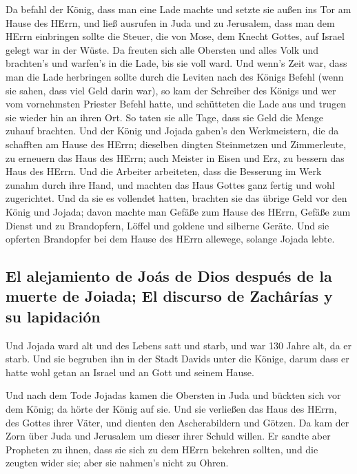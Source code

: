  Da befahl der König, dass man eine Lade machte und setzte
sie außen ins Tor am Hause des HErrn,  und ließ ausrufen
in Juda und zu Jerusalem, dass man dem HErrn einbringen sollte die
Steuer, die von Mose, dem Knecht Gottes, auf Israel gelegt war in der
Wüste.  Da freuten sich alle Obersten und alles Volk und
brachten's und warfen's in die Lade, bis sie voll ward. 
Und wenn's Zeit war, dass man die Lade herbringen sollte durch die
Leviten nach des Königs Befehl (wenn sie sahen, dass viel Geld darin
war), so kam der Schreiber des Königs und wer vom vornehmsten Priester
Befehl hatte, und schütteten die Lade aus und trugen sie wieder hin an
ihren Ort. So taten sie alle Tage, dass sie Geld die Menge zuhauf
brachten.  Und der König und Jojada gaben's den
Werkmeistern, die da schafften am Hause des HErrn; dieselben dingten
Steinmetzen und Zimmerleute, zu erneuern das Haus des HErrn; auch
Meister in Eisen und Erz, zu bessern das Haus des HErrn. 
Und die Arbeiter arbeiteten, dass die Besserung im Werk zunahm durch
ihre Hand, und machten das Haus Gottes ganz fertig und wohl zugerichtet.
 Und da sie es vollendet hatten, brachten sie das übrige
Geld vor den König und Jojada; davon machte man Gefäße zum Hause des
HErrn, Gefäße zum Dienst und zu Brandopfern, Löffel und goldene und
silberne Geräte. Und sie opferten Brandopfer bei dem Hause des HErrn
allewege, solange Jojada lebte.

\hypertarget{el-alejamiento-de-jouxe1s-de-dios-despuuxe9s-de-la-muerte-de-joiada-el-discurso-de-zachuxe2ruxedas-y-su-lapidaciuxf3n}{%
\subsection{El alejamiento de Joás de Dios después de la muerte de
Joiada; El discurso de Zachârías y su
lapidación}\label{el-alejamiento-de-jouxe1s-de-dios-despuuxe9s-de-la-muerte-de-joiada-el-discurso-de-zachuxe2ruxedas-y-su-lapidaciuxf3n}}

 Und Jojada ward alt und des Lebens satt und starb, und
war 130 Jahre alt, da er starb.  Und sie begruben ihn in
der Stadt Davids unter die Könige, darum dass er hatte wohl getan an
Israel und an Gott und seinem Hause.

 Und nach dem Tode Jojadas kamen die Obersten in Juda und
bückten sich vor dem König; da hörte der König auf sie. 
Und sie verließen das Haus des HErrn, des Gottes ihrer Väter, und
dienten den Ascherabildern und Götzen. Da kam der Zorn über Juda und
Jerusalem um dieser ihrer Schuld willen.  Er sandte aber
Propheten zu ihnen, dass sie sich zu dem HErrn bekehren sollten, und die
zeugten wider sie; aber sie nahmen's nicht zu Ohren.


